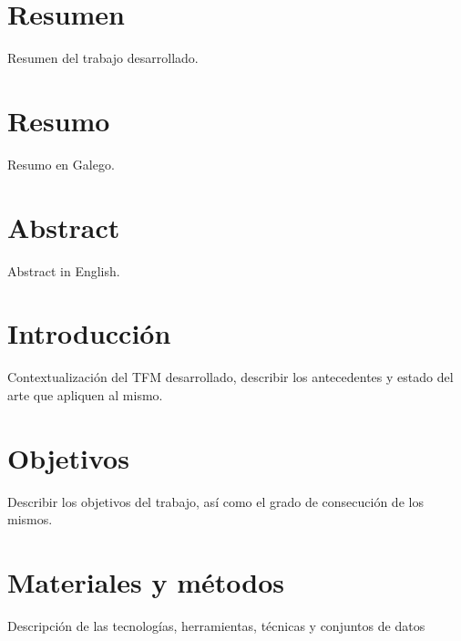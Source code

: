 \documentclass[10pt,a4paper]{article}
\begin{document}
\renewcommand*\listtablename{Listado de tablas}
{\hypersetup{hidelinks}\listoftables}




\newpage


\section*{Resumen}

Resumen del trabajo desarrollado.

\section*{Resumo}

Resumo en Galego.

\section*{Abstract}

Abstract in English.


\newpage

\section{Introducción}

Contextualización del TFM desarrollado, describir los antecedentes y estado del arte que apliquen al mismo.


\section{Objetivos}
Describir los objetivos del trabajo, así como el grado de consecución de los mismos.

\section{Materiales y métodos}
Descripción de las tecnologías, herramientas, técnicas y conjuntos de datos 
\end{document}
